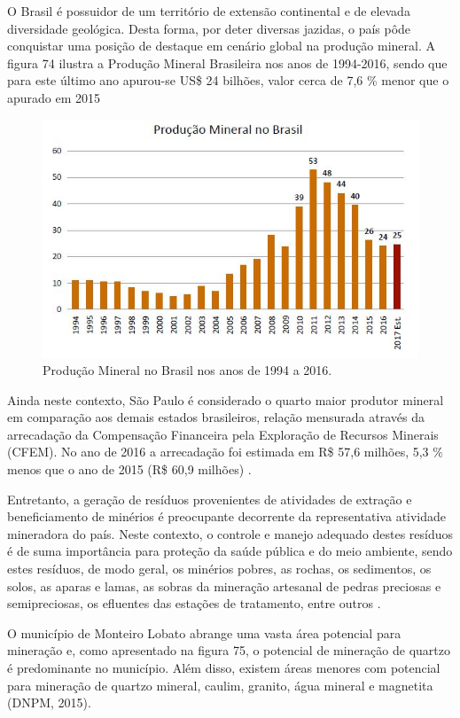 	O Brasil é possuidor de um território de extensão continental e de elevada diversidade geológica. Desta forma, por deter diversas jazidas, o país pôde conquistar uma posição de destaque em cenário global na produção mineral. A figura 74 ilustra a Produção Mineral Brasileira nos anos de 1994-2016, sendo que para este último ano apurou-se US\$ 24 bilhões, valor cerca de 7,6 \% menor que o apurado em 2015 %
	
	\begin{figure}
		\centering
		\includegraphics[width=0.75\linewidth]{produtos/prodtres/image090}
		\caption{Produção Mineral no Brasil nos anos de 1994 a 2016.}
		\label{fig:image090}
	\end{figure}
	
	
	Ainda neste contexto, São Paulo é considerado o quarto maior produtor mineral em comparação aos demais estados brasileiros, relação mensurada através da arrecadação da Compensação Financeira pela Exploração de Recursos Minerais (CFEM). No ano de 2016 a arrecadação foi estimada em R\$ 57,6 milhões, 5,3 \% menos que o ano de 2015 (R\$ 60,9 milhões) \cite{informe2016}.

	Entretanto, a geração de resíduos provenientes de atividades de extração e beneficiamento de minérios é preocupante decorrente da representativa atividade mineradora do país. Neste contexto, o controle e manejo adequado destes resíduos é de suma importância para proteção da saúde pública e do meio ambiente, sendo estes resíduos, de modo geral, os minérios pobres, as rochas, os sedimentos, os solos, as aparas e lamas, as sobras da mineração artesanal de pedras preciosas e semipreciosas, os efluentes das estações de tratamento, entre outros \cite{IBRAM2016}. 
	
	O município de Monteiro Lobato abrange uma vasta área potencial para mineração e, como apresentado na figura 75, o potencial de mineração de quartzo é predominante no município. Além disso, existem áreas menores com potencial para mineração de quartzo mineral, caulim, granito, água mineral e magnetita (DNPM, 2015).
	
